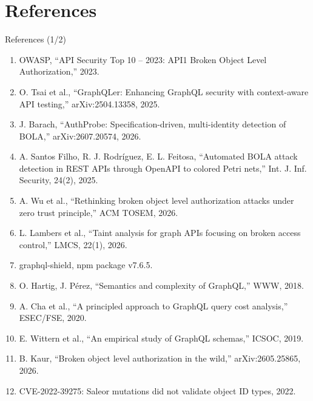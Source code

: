 \documentclass[aspectratio=169,11pt]{beamer}
\begin{document}
\section{References}
\begin{frame}{References (1/2)}
\scriptsize
\begin{enumerate}\setlength{\itemsep}{1pt}
\item[{[1]}] OWASP, “API Security Top 10 – 2023: API1 Broken Object Level Authorization,” 2023.
\item[{[2]}] O. Tsai et al., “GraphQLer: Enhancing GraphQL security with context-aware API testing,” arXiv:2504.13358, 2025.
\item[{[3]}] J. Barach, “AuthProbe: Specification-driven, multi-identity detection of BOLA,” arXiv:2607.20574, 2026.
\item[{[4]}] A. Santos Filho, R. J. Rodríguez, E. L. Feitosa, “Automated BOLA attack detection in REST APIs through OpenAPI to colored Petri nets,” Int. J. Inf. Security, 24(2), 2025.
\item[{[5]}] A. Wu et al., “Rethinking broken object level authorization attacks under zero trust principle,” ACM TOSEM, 2026.
\item[{[6]}] L. Lambers et al., “Taint analysis for graph APIs focusing on broken access control,” LMCS, 22(1), 2026.
\item[{[7]}] graphql-shield, npm package v7.6.5.
\item[{[8]}] O. Hartig, J. Pérez, “Semantics and complexity of GraphQL,” WWW, 2018.
\item[{[9]}] A. Cha et al., “A principled approach to GraphQL query cost analysis,” ESEC/FSE, 2020.
\item[{[10]}] E. Wittern et al., “An empirical study of GraphQL schemas,” ICSOC, 2019.
\item[{[11]}] B. Kaur, “Broken object level authorization in the wild,” arXiv:2605.25865, 2026.
\item[{[12]}] CVE-2022-39275: Saleor mutations did not validate object ID types, 2022.
\end{enumerate}
\end{frame}
\end{document}
